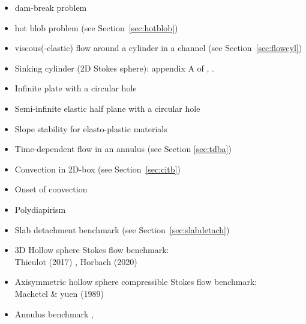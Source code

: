 \begin{itemize}
\item dam-break problem \cite{moeb99,bacp07,liir07,lemx08,homa09,anco09,grdn97,hini81,basd08}
\item hot blob problem \cite{bugs09,fumt11} (see Section~\ref{sec:hotblob})
\item viscous(-elastic) flow around a cylinder in a channel (see Section~\ref{sec:flowcyl})
\item Sinking cylinder (2D Stokes sphere): appendix A of \cite{boht08a}, \cite{wali04}.
\item Infinite plate with a circular hole \cite{yiha10,rama16}
\item Semi-infinite elastic half plane with a circular hole \cite{verr98}
\item Slope stability for elasto-plastic materials \cite{rama16}
\item Time-dependent flow in an annulus \cite{galb19} (see Section \ref{sec:tdba})
\item Convection in 2D-box \cite{galb19} (see Section~\ref{sec:citb})
\item Onset of convection \cite{aspectmanual}
\item Polydiapirism \cite{wesc92,aspectmanual}
\item Slab detachment benchmark (see Section~\ref{sec:slabdetach}) 
\item 3D Hollow sphere Stokes flow benchmark:\\
      Thieulot (2017) \cite{thie17},
      Horbach \etal (2020) \cite{homb20}
\item Axisymmetric hollow sphere compressible Stokes flow benchmark:\\
      Machetel \& yuen (1989) \cite{mayu89}
\item Annulus benchmark \cite{aspectmanual}, \cite{ples11}


\end{itemize}
